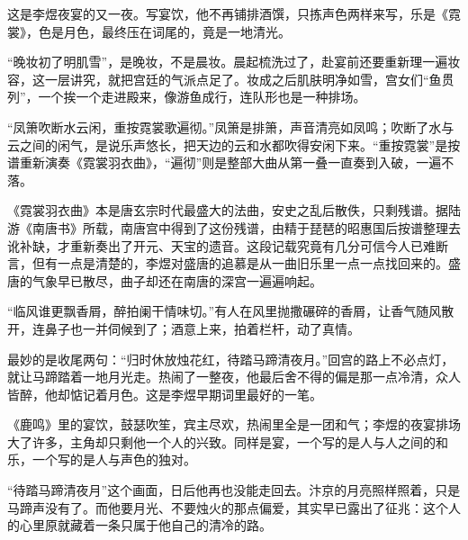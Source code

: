 \begin{appreciation}
这是李煜夜宴的又一夜。写宴饮，他不再铺排酒馔，只拣声色两样来写，乐是《霓裳》，色是月色，最终压在词尾的，竟是一地清光。

“晚妆初了明肌雪”，是晚妆，不是晨妆。晨起梳洗过了，赴宴前还要重新理一遍妆容，这一层讲究，就把宫廷的气派点足了。妆成之后肌肤明净如雪，宫女们“鱼贯列”，一个挨一个走进殿来，像游鱼成行，连队形也是一种排场。

“凤箫吹断水云闲，重按霓裳歌遍彻。”凤箫是排箫，声音清亮如凤鸣；吹断了水与云之间的闲气，是说乐声悠长，把天边的云和水都吹得安闲下来。“重按霓裳”是按谱重新演奏《霓裳羽衣曲》，“遍彻”则是整部大曲从第一叠一直奏到入破，一遍不落。

《霓裳羽衣曲》本是唐玄宗时代最盛大的法曲，安史之乱后散佚，只剩残谱。据陆游《南唐书》所载，南唐宫中得到了这份残谱，由精于琵琶的昭惠国后按谱整理去讹补缺，才重新奏出了开元、天宝的遗音。这段记载究竟有几分可信今人已难断言，但有一点是清楚的，李煜对盛唐的追慕是从一曲旧乐里一点一点找回来的。盛唐的气象早已散尽，曲子却还在南唐的深宫一遍遍响起。

“临风谁更飘香屑，醉拍阑干情味切。”有人在风里抛撒碾碎的香屑，让香气随风散开，连鼻子也一并伺候到了；酒意上来，拍着栏杆，动了真情。

最妙的是收尾两句：“归时休放烛花红，待踏马蹄清夜月。”回宫的路上不必点灯，就让马蹄踏着一地月光走。热闹了一整夜，他最后舍不得的偏是那一点冷清，众人皆醉，他却惦记着月色。这是李煜早期词里最好的一笔。

《鹿鸣》里的宴饮，鼓瑟吹笙，宾主尽欢，热闹里全是一团和气；李煜的夜宴排场大了许多，主角却只剩他一个人的兴致。同样是宴，一个写的是人与人之间的和乐，一个写的是人与声色的独对。

“待踏马蹄清夜月”这个画面，日后他再也没能走回去。汴京的月亮照样照着，只是马蹄声没有了。而他要月光、不要烛火的那点偏爱，其实早已露出了征兆：这个人的心里原就藏着一条只属于他自己的清冷的路。
\end{appreciation}
